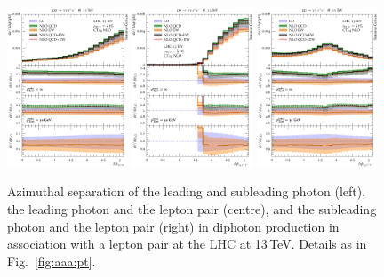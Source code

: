 \begin{figure}[t!]
  \centering
  \includegraphics[width=0.32\textwidth]{figs_aaz/dphi_y1_y2}
  \includegraphics[width=0.32\textwidth]{figs_aaz/dphi_y1_l1l2}
  \includegraphics[width=0.32\textwidth]{figs_aaz/dphi_y2_l1l2}
  \caption{
    Azimuthal separation of the leading and subleading photon (left),
    the leading photon and the lepton pair (centre), and the subleading 
    photon and the lepton pair (right)
    in diphoton production in association with a lepton pair 
    at the LHC at 13\,TeV. 
    Details as in Fig.\ \ref{fig:aaa:pt}.
    \label{fig:aaz:dphi}
  }
\end{figure}

